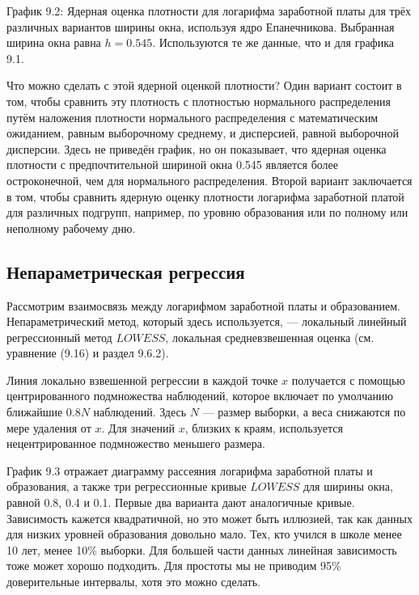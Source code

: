 \vspace{5cm}

График 9.2: Ядерная оценка плотности для логарифма заработной платы для трёх различных вариантов ширины окна, используя ядро Епанечникова. Выбранная ширина окна равна $h = 0.545$. Используются те же данные, что и для графика 9.1.

Что можно сделать с этой ядерной оценкой плотности? Один вариант состоит в том, чтобы сравнить эту плотность с плотностью нормального распределения путём наложения плотности нормального распределения с математическим ожиданием, равным выборочному среднему, и дисперсией, равной выборочной дисперсии. Здесь не приведён график, но он показывает, что ядерная оценка плотности с предпочтительной шириной окна 0.545 является более остроконечной, чем для нормального распределения. Второй вариант заключается в том, чтобы сравнить ядерную оценку плотности логарифма заработной платой для различных подгрупп, например, по уровню образования или по полному или неполному рабочему дню.


\subsection{Непараметрическая регрессия}

Рассмотрим взаимосвязь между логарифмом заработной платы и образованием. Непараметрический метод, который здесь используется, --- локальный линейный регрессионный метод $LOWESS$, локальная средневзвешенная оценка (см. уравнение (9.16) и раздел 9.6.2).

Линия локально взвешенной регрессии в каждой точке $x$ получается с помощью центрированного подмножества наблюдений, которое включает  по умолчанию ближайшие $0.8N$ наблюдений. Здесь $N$ --- размер выборки, а веса снижаются по мере удаления от $x$. Для значений $x$, близких к краям, используется нецентрированное подмножество меньшего размера.

График 9.3 отражает диаграмму рассеяния логарифма заработной платы и образования, а также три регрессионные кривые $LOWESS$ для ширины окна, равной 0.8, 0.4 и 0.1. Первые два варианта дают аналогичные кривые. Зависимость кажется квадратичной, но это может быть иллюзией, так как данных для низких уровней образования довольно мало. Тех, кто учился в школе менее 10 лет, менее 10\% выборки. Для большей части данных линейная зависимость тоже может хорошо подходить. Для простоты мы не приводим 95\% доверительные интервалы, хотя это можно сделать.

\vspace{5cm}

